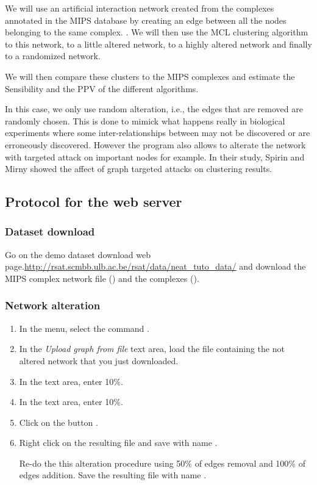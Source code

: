 We will use an artificial interaction network created from the complexes annotated in the MIPS database by creating an edge between all the nodes belonging to the same complex. \cite{Mewes2007}. We will then use the MCL clustering algorithm to this network, to a little altered network, to a highly altered network and finally to a randomized network. 

We will then compare these clusters to the MIPS complexes and estimate the Sensibility and the PPV of the different algorithms.

In this case, we only use random alteration, i.e., the edges that are removed are randomly chosen. This is done to mimick what happens really in biological experiments where some inter-relationships between may not be discovered or are erroneously discovered. However the  program also allows to alterate the network with targeted attack on important nodes for example. In their study, Spirin and Mirny \cite{Spirin2003} showed the affect of graph targeted attacks on clustering results.

\subsection{Protocol for the web server}

\subsubsection{Dataset download}
Go on the demo dataset download web page.\url{http://rsat.scmbb.ulb.ac.be/rsat/data/neat\_tuto\_data/} and download the MIPS complex network file () and the complexes ().

\subsubsection{Network alteration}

\begin{enumerate}

\item In the \neat menu, select the command . 
\item In the \textit{Upload graph from file} text area, load the file  containing the not altered network that you just downloaded.
\item In the  text area, enter 10\%.
\item In the  text area, enter 10\%.
\item Click on the button . 
\item Right click on the resulting file and save with name .

Re-do the this alteration procedure using 50\% of edges removal and 100\% of edges addition. Save the resulting file with name .

\end{enumerate}

